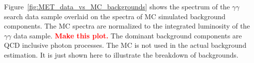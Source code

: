 \documentclass[dissertation.tex]{subfiles}
\begin{document}
%

Figure~\ref{fig:MET_data_vs_MC_backgrounds} shows the \MET spectrum of the $\gamma\gamma$ search data sample overlaid on the \MET spectra of MC simulated background components.  The MC spectra are normalized to the integrated luminosity of the $\gamma\gamma$ data sample.  \textcolor{red}{\textbf{Make this plot.}}  The dominant background components are QCD inclusive photon processes.  The MC is not used in the actual background estimation.  It is just shown here to illustrate the breakdown of backgrounds.

\end{document}
